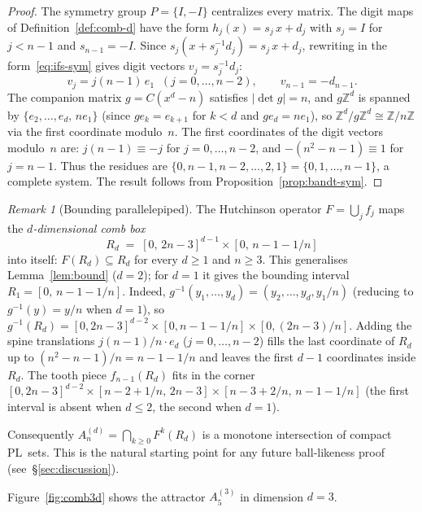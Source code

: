 \documentclass{amsart}
\theoremstyle{definition}
\theoremstyle{remark}
\newtheorem{remark}[theorem]{Remark}
\newcommand{\Z}{\mathbb{Z}}
\begin{document}
\begin{proof}
The symmetry group $P = \{I,-I\}$ centralizes every matrix.
The digit maps of Definition~\ref{def:comb-d} have the form
$h_j(x) = s_j\,x + d_j$ with $s_j = I$ for $j < n{-}1$
and $s_{n-1} = -I$.
Since $s_j(x + s_j^{-1}d_j) = s_j\,x + d_j$,
rewriting in the form~\eqref{eq:ifs-sym} gives digit vectors
$v_j = s_j^{-1}d_j$:
\[
  v_j = j(n{-}1)\,e_1 \;\;(j = 0,\ldots,n{-}2),
  \qquad
  v_{n-1} = -d_{n-1}.
\]
The companion matrix $g = C(x^d - n)$ satisfies $|\det g| = n$,
and $g\Z^d$ is spanned by $\{e_2,\ldots,e_d,\,ne_1\}$
(since $ge_k = e_{k+1}$ for $k < d$ and $ge_d = ne_1$),
so $\Z^d/g\Z^d \cong \Z/n\Z$ via the first coordinate modulo~$n$.
The first coordinates of the digit vectors modulo~$n$ are:
$j(n{-}1) \equiv -j$ for $j = 0,\ldots,n{-}2$,
and $-(n^2{-}n{-}1) \equiv 1$ for $j = n{-}1$.
Thus the residues are
$\{0, n{-}1, n{-}2, \ldots, 2, 1\} = \{0,1,\ldots,n{-}1\}$,
a complete system.
The result follows from Proposition~\ref{prop:bandt-sym}.
\end{proof}

\begin{remark}[Bounding parallelepiped]\label{rem:invariant-d}
The Hutchinson operator $F = \bigcup_j f_j$ maps the
\emph{$d$-dimensional comb box}
\[
  R_d \;=\; [0,\, 2n{-}3]^{d-1} \times [0,\, n{-}1{-}1/n]
\]
into itself: $F(R_d) \subseteq R_d$ for every $d \ge 1$ and
$n \ge 3$.  This generalises Lemma~\ref{lem:bound} ($d = 2$);
for $d = 1$ it gives the bounding interval
$R_1 = [0,\, n{-}1{-}1/n]$.
Indeed, $g^{-1}(y_1, \ldots, y_d) = (y_2, \ldots, y_d, y_1/n)$
(reducing to $g^{-1}(y) = y/n$ when $d = 1$),
so $g^{-1}(R_d) = [0,2n{-}3]^{d-2} \times [0, n{-}1{-}1/n]
\times [0, (2n{-}3)/n]$.  Adding the spine
translations $j(n{-}1)/n\cdot e_d$ ($j = 0, \ldots, n{-}2$)
fills the last coordinate of $R_d$ up to $(n^2{-}n{-}1)/n
= n{-}1{-}1/n$ and leaves the first $d{-}1$ coordinates inside
$R_d$.  The tooth piece $f_{n-1}(R_d)$ fits in the corner
$[0, 2n{-}3]^{d-2} \times [n{-}2{+}1/n,\, 2n{-}3]
\times [n{-}3{+}2/n,\, n{-}1{-}1/n]$
(the first interval is absent when $d \le 2$, the second when
$d = 1$).

Consequently $A_n^{(d)} = \bigcap_{k\ge 0} F^k(R_d)$ is a
monotone intersection of compact PL~sets.  This is the natural
starting point for any future ball-likeness proof
(see~\S\ref{sec:discussion}).
\end{remark}

Figure~\ref{fig:comb3d} shows the attractor $A_5^{(3)}$
in dimension $d = 3$.
\end{document}

